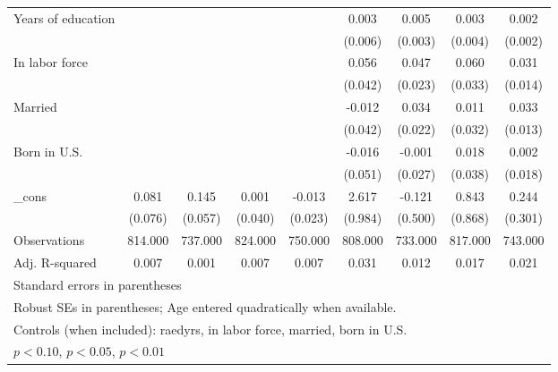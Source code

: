 \begin{table}[htbp]
\begin{tabular}{l*{8}{c}}
Years of education&                  &                  &                  &                  &    0.003         &    0.005         &    0.003         &    0.002         \\
          &                  &                  &                  &                  &  (0.006)         &  (0.003)         &  (0.004)         &  (0.002)         \\
In labor force&                  &                  &                  &                  &    0.056         &    0.047\sym{**} &    0.060\sym{*}  &    0.031\sym{**} \\
          &                  &                  &                  &                  &  (0.042)         &  (0.023)         &  (0.033)         &  (0.014)         \\
Married   &                  &                  &                  &                  &   -0.012         &    0.034         &    0.011         &    0.033\sym{**} \\
          &                  &                  &                  &                  &  (0.042)         &  (0.022)         &  (0.032)         &  (0.013)         \\
Born in U.S.&                  &                  &                  &                  &   -0.016         &   -0.001         &    0.018         &    0.002         \\
          &                  &                  &                  &                  &  (0.051)         &  (0.027)         &  (0.038)         &  (0.018)         \\
\_cons    &    0.081         &    0.145\sym{**} &    0.001         &   -0.013         &    2.617\sym{***}&   -0.121         &    0.843         &    0.244         \\
          &  (0.076)         &  (0.057)         &  (0.040)         &  (0.023)         &  (0.984)         &  (0.500)         &  (0.868)         &  (0.301)         \\
\midrule
Observations&  814.000         &  737.000         &  824.000         &  750.000         &  808.000         &  733.000         &  817.000         &  743.000         \\
Adj. R-squared&    0.007         &    0.001         &    0.007         &    0.007         &    0.031         &    0.012         &    0.017         &    0.021         \\
\bottomrule
\multicolumn{9}{l}{\footnotesize Standard errors in parentheses}\\
\multicolumn{9}{l}{\footnotesize Robust SEs in parentheses; Age entered quadratically when available.}\\
\multicolumn{9}{l}{\footnotesize Controls (when included): raedyrs, in labor force, married, born in U.S.}\\
\multicolumn{9}{l}{\footnotesize \sym{*} \(p<0.10\), \sym{**} \(p<0.05\), \sym{***} \(p<0.01\)}\\
\end{tabular}
\end{table}
